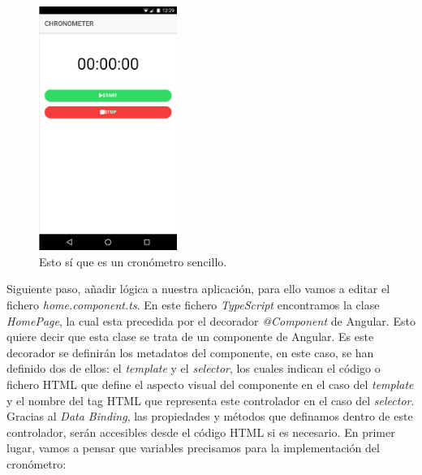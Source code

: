 \begin{figure}[H]
\centering
  \includegraphics[width=0.4\textwidth]{Figures/ch2/Chronometer/1}
  \caption{Esto sí que es un cronómetro sencillo.}
\end{figure}


Siguiente paso, añadir lógica a nuestra aplicación, para ello vamos a editar el fichero \emph{home.component.ts}. En este fichero \emph{TypeScript} encontramos la clase \emph{HomePage}, la cual esta precedida por el decorador \emph{@Component} de Angular. Esto quiere decir que esta clase se trata de un componente de Angular. Es este decorador se definirán los metadatos del componente, en este caso, se han definido dos de ellos: el \emph{template} y el \emph{selector}, los cuales indican el código o fichero \gls{HTML} que define el aspecto visual del componente en el caso del \emph{template} y el nombre del tag \gls{HTML} que representa este controlador en el caso del \emph{selector}. Gracias al \emph{Data Binding}, las propiedades y métodos que definamos dentro de este controlador, serán accesibles desde el código \gls{HTML} si es necesario. En primer lugar, vamos a pensar que variables precisamos para la implementación del cronómetro:

